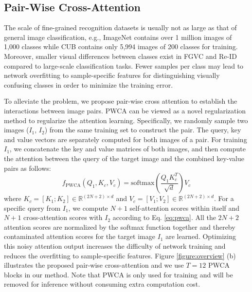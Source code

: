 \subsection{Pair-Wise Cross-Attention}
The scale of fine-grained recognition datasets is usually not as large as that of general image classification, e.g., ImageNet \cite{deng2009imagenet} contains over 1 million images of 1,000 classes while CUB \cite{wah2011caltech} contains only 5,994 images of 200 classes for training. Moreover, smaller visual differences between classes exist in FGVC and Re-ID compared to large-scale classification tasks. Fewer samples per class may lead to network overfitting to sample-specific features for distinguishing visually confusing classes in order to minimize the training error. 

To alleviate the problem, we propose pair-wise cross attention to establish the interactions between image pairs. PWCA can be viewed as a novel regularization method to regularize the attention learning. Specifically, we randomly sample two images ($I_1$, $I_2$) from the same training set to construct the pair. The query, key and value vectors are separately computed for both images of a pair. For training $I_1$, we concatenate the key and value matrices of both images, and then compute the attention between the query of the target image and the combined key-value pairs as follows:
\begin{equation}
    f_{\mbox{PWCA}}(Q_1,K_c,V_c) =\mbox{softmax}(\frac{Q_1 K_c^T}{\sqrt{d}})V_c
\label{eq:pwca}
\end{equation}
where $K_c=[K_1;K_2] \in \mathbb{R}^{(2N+2)\times d}$ and $V_c=[V_1;V_2] \in \mathbb{R}^{(2N+2)\times d}$. For a specific query from $I_1$, we compute $N+1$ self-attention scores within itself and $N+1$ cross-attention scores with $I_2$ according to Eq. \ref{eq:pwca}. All the $2N+2$ attention scores are normalized by the softmax function together and thereby contaminated attention scores for the target image $I_1$ are learned. 
Optimizing this noisy attention output increases the difficulty of network training and reduces the overfitting to sample-specific features. Figure \ref{figure:overview} (b) illustrates the proposed pair-wise cross-attention and we use $T=12$ PWCA blocks in our method. Note that PWCA is only used for training and will be removed for inference without consuming extra computation cost.  

